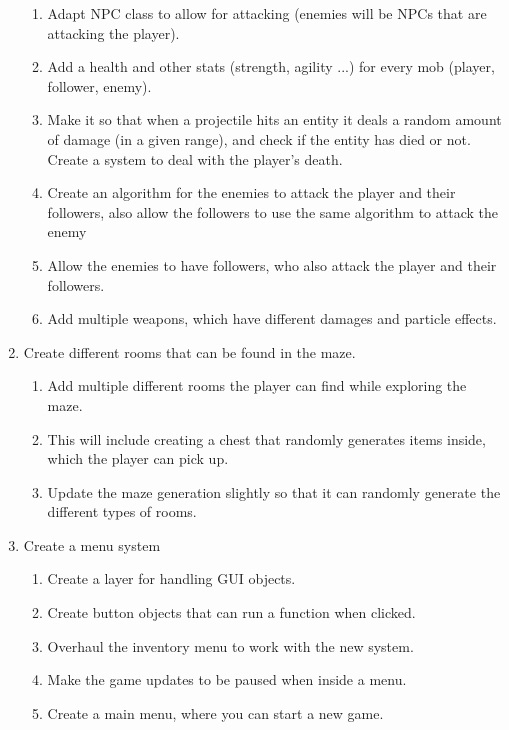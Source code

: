 \documentclass[../Main.tex]{subfiles}
\begin{document}
\begin{enumerate}
\begin{enumerate}
                    \item Adapt NPC class to allow for attacking (enemies will be NPCs that are attacking the player).
                    \item Add a health and other stats (strength, agility ...) for every mob (player, follower, enemy).
                    \item Make it so that when a projectile hits an entity it deals a random amount of damage (in a given range), and check if the entity has died or not. Create a system to deal with the player's death.
                    \item Create an algorithm for the enemies to attack the player and their followers, also allow the followers to use the same algorithm to attack the enemy
                    \item Allow the enemies to have followers, who also attack the player and their followers.
                    \item Add multiple weapons, which have different damages and particle effects.
                \end{enumerate}
            \item Create different rooms that can be found in the maze.
                \begin{enumerate}
                    \item Add multiple different rooms the player can find while exploring the maze.
                    \item This will include creating a chest that randomly generates items inside, which the player can pick up.
                    \item Update the maze generation slightly so that it can randomly generate the different types of rooms.
                \end{enumerate}
            \item Create a menu system
                \begin{enumerate}
                    \item Create a layer for handling GUI objects.
                    \item Create button objects that can run a function when clicked.
                    \item Overhaul the inventory menu to work with the new system.
                    \item Make the game updates to be paused when inside a menu.
                    \item Create a main menu, where you can start a new game.

\end{enumerate}
\end{enumerate}
\end{document}
